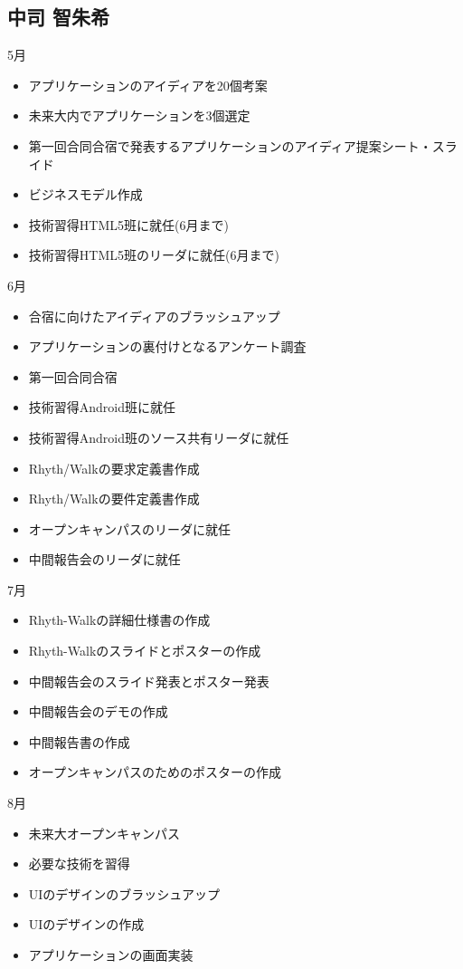 \subsection{中司 智朱希}

5月
\begin{itemize}
\item アプリケーションのアイディアを20個考案
\item 未来大内でアプリケーションを3個選定
\item 第一回合同合宿で発表するアプリケーションのアイディア提案シート・スライド\item ビジネスモデル作成
\item 技術習得HTML5班に就任(6月まで)
\item 技術習得HTML5班のリーダに就任(6月まで)
\end{itemize}
6月
\begin{itemize}
\item 合宿に向けたアイディアのブラッシュアップ
\item アプリケーションの裏付けとなるアンケート調査
\item 第一回合同合宿
\item 技術習得Android班に就任
\item 技術習得Android班のソース共有リーダに就任
\item Rhyth/Walkの要求定義書作成
\item Rhyth/Walkの要件定義書作成
\item オープンキャンパスのリーダに就任
\item 中間報告会のリーダに就任
\end{itemize}
7月
\begin{itemize}
\item Rhyth-Walkの詳細仕様書の作成
\item Rhyth-Walkのスライドとポスターの作成
\item 中間報告会のスライド発表とポスター発表
\item 中間報告会のデモの作成
\item 中間報告書の作成
\item オープンキャンパスのためのポスターの作成
\end{itemize}
8月
\begin{itemize}
\item 未来大オープンキャンパス
\item 必要な技術を習得
\item UIのデザインのブラッシュアップ
\item UIのデザインの作成
\item アプリケーションの画面実装
\end{itemize}
